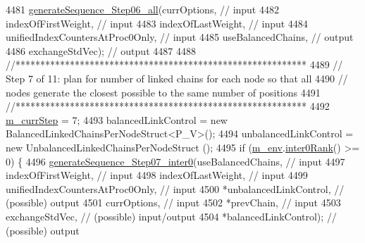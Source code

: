 \begin{DoxyCode}
{{4481     \hyperlink{class_q_u_e_s_o_1_1_m_l_sampling_a21f642100e0690f65563e2c1f8bed816}{generateSequence\_Step06\_all}(currOptions,                     \textcolor{comment}{// input}
4482                                 indexOfFirstWeight,              \textcolor{comment}{// input}
4483                                 indexOfLastWeight,               \textcolor{comment}{// input}
4484                                 unifiedIndexCountersAtProc0Only, \textcolor{comment}{// input}
4485                                 useBalancedChains,               \textcolor{comment}{// output}
4486                                 exchangeStdVec);                 \textcolor{comment}{// output}
4487 
4488     \textcolor{comment}{//***********************************************************}
4489     \textcolor{comment}{// Step 7 of 11: plan for number of linked chains for each node so that all}
4490     \textcolor{comment}{//               nodes generate the closest possible to the same number of positions}
4491     \textcolor{comment}{//***********************************************************}
4492     \hyperlink{class_q_u_e_s_o_1_1_m_l_sampling_a1b1f8ccb4823bdfa26ec652f0807c63e}{m\_currStep} = 7;
4493     balancedLinkControl   = \textcolor{keyword}{new} BalancedLinkedChainsPerNodeStruct<P\_V>();
4494     unbalancedLinkControl = \textcolor{keyword}{new} UnbalancedLinkedChainsPerNodeStruct   ();
4495     \textcolor{keywordflow}{if} (\hyperlink{class_q_u_e_s_o_1_1_m_l_sampling_a13f1ca4fe9f94822fe572a743eaced1d}{m\_env}.\hyperlink{class_q_u_e_s_o_1_1_base_environment_ae106b5bb8a80b655b88b3a26b1e7c185}{inter0Rank}() >= 0) \{
4496       \hyperlink{class_q_u_e_s_o_1_1_m_l_sampling_a270d639f90f6f2c60d1af851eea63d41}{generateSequence\_Step07\_inter0}(useBalancedChains,               \textcolor{comment}{//
       input}
4497                                      indexOfFirstWeight,              \textcolor{comment}{// input}
4498                                      indexOfLastWeight,               \textcolor{comment}{// input}
4499                                      unifiedIndexCountersAtProc0Only, \textcolor{comment}{// input}
4500                                      *unbalancedLinkControl,          \textcolor{comment}{// (possible) output}
4501                                      currOptions,                     \textcolor{comment}{// input}
4502                                      *prevChain,                      \textcolor{comment}{// input}
4503                                      exchangeStdVec,                  \textcolor{comment}{// (possible) input/output}
4504                                      *balancedLinkControl);           \textcolor{comment}{// (possible) output}
}}
\end{DoxyCode}

